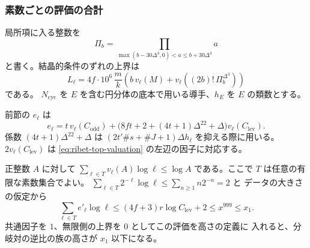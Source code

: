 \subsubsection{素数ごとの評価の合計}

局所項に入る整数を
\[
 \Pi_b=\prod_{\max(b-30\Delta^3,0)<a\le b+30\Delta^3}a
\]
と書く。結晶的条件のずれの上界は
\[
 L_\ell=4f\cdot 10^6\,\frac{m}{k}
        \left(b\,v_\ell(M)+v_\ell\!\left((2b)!\,\Pi_b^{\Delta^3}\right)\right)
\]
である。
\(N_{\mathrm{cyc}}\) を \(E\) を含む円分体の底本で用いる導手、\(h_E\) を \(E\) の類数とする。



前節の \(e_\ell\) は
\[
 e_\ell=t\,v_\ell(C_{\mathrm{odd}})
  +\bigl(8ft+2+(4t+1)\Delta^{22}+\Delta\bigr)v_\ell(C_{\mathrm{lev}}).
\]
係数 \((4t+1)\Delta^{22}+\Delta\) は
\((2t'\#s+\#J+1)\Delta h_\ell\) を抑える際に用いる。
\(2v_\ell(C_{\mathrm{lev}})\) は
\eqref{eq:ribet-top-valuation} の左辺の因子に対応する。

正整数 \(A\) に対して \(\sum_{\ell\in T}v_\ell(A)\log\ell\le\log A\)
である。ここで \(T\) は任意の有限な素数集合でよい。
\(\sum_{\ell\in T}2^{-\ell}\log\ell\le\sum_{n\ge1}n2^{-n}=2\) と
データの大きさの仮定から
\[
 \sum_{\ell\in T} e'_\ell\log\ell
 \le (4f+3)r\log C_{\mathrm{lev}}+2\le x^{999}\le x_1 .
\]
共通因子を \(1\)、無限側の上界を \(0\) としてこの評価を高さの定義に
入れると、分岐対の逆比の族の高さが \(x_1\) 以下になる。

